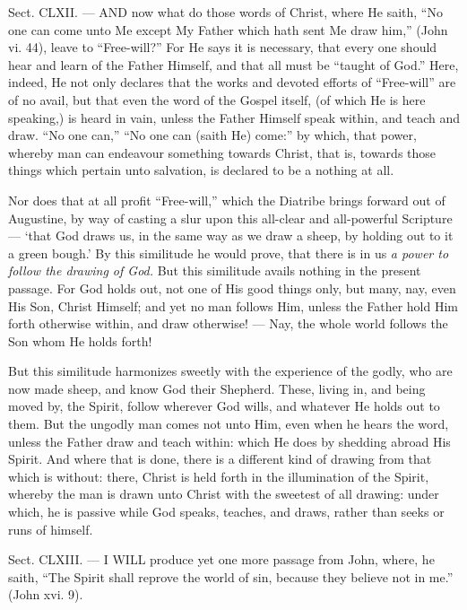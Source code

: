 
Sect. CLXII. — AND now what do those words of Christ, where He saith, “No one can come unto Me except My Father which hath sent Me draw him,” (John vi. 44), leave to “Free-will?” For He says it is necessary, that every one should hear and learn of the Father Himself, and that all must be “taught of God.” Here, indeed, He not only declares that the works and devoted efforts of “Free-will” are of no avail, but that even the word of the Gospel itself, (of which He is here speaking,) is heard in vain, unless the Father Himself speak within, and teach and draw. “No one can,” “No one can (saith He) come:” by which, that power, whereby man can endeavour something towards Christ, that is, towards those things which pertain unto salvation, is declared to be a nothing at all.

Nor does that at all profit “Free-will,” which the Diatribe brings forward out of Augustine, by way of casting a slur upon this all-clear and all-powerful Scripture — ‘that God draws us, in the same way as we draw a sheep, by holding out to it a green bough.’ By this similitude he would prove, that there is in us \emph{a power to follow the drawing of God. } But this similitude avails nothing in the present passage. For God holds out, not one of His good things only, but many, nay, even His Son, Christ Himself; and yet no man follows Him, unless the Father hold Him forth otherwise within, and draw otherwise! — Nay, the whole world follows the Son whom He holds forth!

But this similitude harmonizes sweetly with the experience of the godly, who are now made sheep, and know God their Shepherd. These, living in, and being moved by, the Spirit, follow wherever God wills, and whatever He holds out to them. But the ungodly man comes not unto Him, even when he hears the word, unless the Father draw and teach within: which He does by shedding abroad His Spirit. And where that is done, there is a different kind of drawing from that which is without: there, Christ is held forth in the illumination of the Spirit, whereby the man is drawn unto Christ with the sweetest of all drawing: under which, he is passive while God speaks, teaches, and draws, rather than seeks or runs of himself.


Sect. CLXIII. — I WILL produce yet one more passage from John, where, he saith, “The Spirit shall reprove the world of sin, because they believe not in me.” (John xvi. 9).

